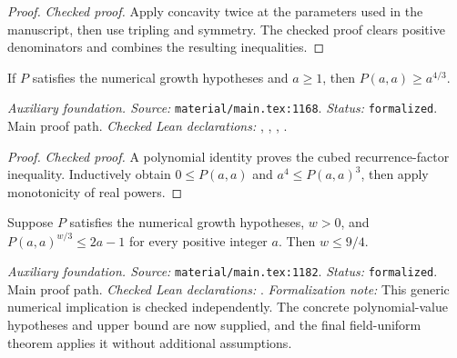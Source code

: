 \begin{proof}
\leanok
{}
\textit{Checked proof.} Apply concavity twice at the parameters used in the manuscript, then use tripling and symmetry. The checked proof clears positive denominators and combines the resulting inequalities.
\end{proof}

\renewcommand{\thetheorem}{A20}
\begin{lemma}
\label{aux:numerical-elementary-growth}
\leanok
If $P$ satisfies the numerical growth hypotheses and $a\ge1$, then $P(a,a)\ge a^{4/3}$.
\end{lemma}

\noindent\textit{Auxiliary foundation. Source:} \texttt{material/main.tex:1168}.
\textit{Status:} \texttt{formalized}. Main proof path.
\textit{Checked Lean declarations:} , , , .

\begin{proof}
\leanok
{}
\textit{Checked proof.} A polynomial identity proves the cubed recurrence-factor inequality. Inductively obtain $0\le P(a,a)$ and $a^4\le P(a,a)^3$, then apply monotonicity of real powers.
\end{proof}

\renewcommand{\thetheorem}{A21}
\begin{lemma}
\label{aux:numerical-endpoint}
\leanok
Suppose $P$ satisfies the numerical growth hypotheses, $w>0$, and $P(a,a)^{w/3}\le2a-1$ for every positive integer $a$. Then $w\le9/4$.
\end{lemma}

\noindent\textit{Auxiliary foundation. Source:} \texttt{material/main.tex:1182}.
\textit{Status:} \texttt{formalized}. Main proof path.
\textit{Checked Lean declarations:} .
\textit{Formalization note:} This generic numerical implication is checked independently. The concrete polynomial-value hypotheses and upper bound are now supplied, and the final field-uniform theorem applies it without additional assumptions.

